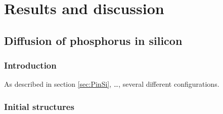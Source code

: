 \documentclass[11pt,bibliography=totoc,index=totoc]{scrbook}   %
\begin{document}




\part{Results and discussion}

\chapter{Diffusion of phosphorus in silicon}

\section{Introduction}\label{sec:resultsIntro}

As described in section \ref{sec:PinSi}, \ldots, several different configurations.


\section{Initial structures}\label{sec:structures}


\end{document}
